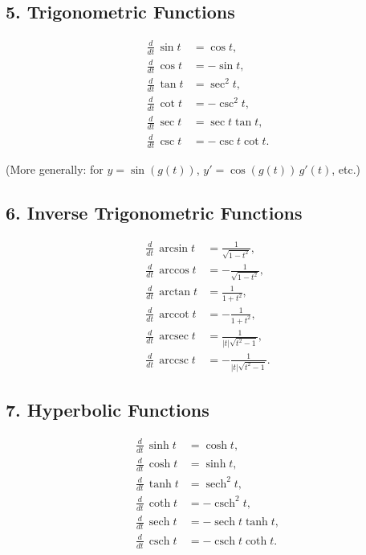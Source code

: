 \documentclass[11pt,a4paper]{article}
\DeclareMathOperator{\arccot}{arccot}
\DeclareMathOperator{\arcsec}{arcsec}
\DeclareMathOperator{\arccsc}{arccsc}
\begin{document}
	\subsection*{5. Trigonometric Functions}
	\[
	\begin{aligned}
		\frac{d}{dt}\,\sin t &= \cos t, \\
		\frac{d}{dt}\,\cos t &= -\sin t, \\
		\frac{d}{dt}\,\tan t &= \sec^2 t, \\
		\frac{d}{dt}\,\cot t &= -\csc^2 t, \\
		\frac{d}{dt}\,\sec t &= \sec t \tan t, \\
		\frac{d}{dt}\,\csc t &= -\csc t \cot t.
	\end{aligned}
	\]
	
	(More generally: for $y=\sin(g(t))$, $y'=\cos(g(t))\,g'(t)$, etc.)
	
	\subsection*{6. Inverse Trigonometric Functions}
	\[
	\begin{aligned}
		\frac{d}{dt}\,\arcsin t &= \frac{1}{\sqrt{1-t^2}}, \\
		\frac{d}{dt}\,\arccos t &= -\frac{1}{\sqrt{1-t^2}}, \\
		\frac{d}{dt}\,\arctan t &= \frac{1}{1+t^2}, \\
		\frac{d}{dt}\,\arccot t &= -\frac{1}{1+t^2}, \\
		\frac{d}{dt}\,\arcsec t &= \frac{1}{|t|\sqrt{t^2-1}}, \\
		\frac{d}{dt}\,\arccsc t &= -\frac{1}{|t|\sqrt{t^2-1}}.
	\end{aligned}
	\]
	
	\subsection*{7. Hyperbolic Functions}
	\[
	\begin{aligned}
		\frac{d}{dt}\,\sinh t &= \cosh t, \\
		\frac{d}{dt}\,\cosh t &= \sinh t, \\
		\frac{d}{dt}\,\tanh t &= \operatorname{sech}^2 t, \\
		\frac{d}{dt}\,\coth t &= -\operatorname{csch}^2 t, \\
		\frac{d}{dt}\,\operatorname{sech} t &= -\operatorname{sech} t \tanh t, \\
		\frac{d}{dt}\,\operatorname{csch} t &= -\operatorname{csch} t \coth t.
	\end{aligned}
	\]
	
\end{document}
